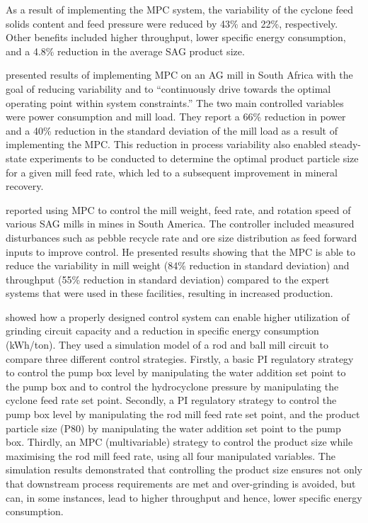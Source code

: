 As a result of implementing the \gls{MPC} system, the variability of the cyclone feed solids content and feed pressure were reduced by 43\% and 22\%, respectively. Other benefits included higher throughput, lower specific energy consumption, and a 4.8\% reduction in the average \acrshort{SAG} product size.

\cite{steyn_benefits_2013} presented results of implementing \gls{MPC} on an \gls{AG} mill in South Africa with the goal of reducing variability and to ``continuously drive towards the optimal operating point within system constraints.'' The two main controlled variables were power consumption and mill load. They report a 66\% reduction in power and a 40\% reduction in the standard deviation of the mill load as a result of implementing the \gls{MPC}. This reduction in process variability also enabled steady-state experiments to be conducted to determine the optimal product particle size for a given mill feed rate, which led to a subsequent improvement in mineral recovery.

\cite{gough_sag_2015} reported using \gls{MPC} to control the mill weight, feed rate, and rotation speed of various \acrshort{SAG} mills in mines in South America. The controller included measured disturbances such as pebble recycle rate and ore size distribution as feed forward inputs to improve control. He presented results showing that the \gls{MPC} is able to reduce the variability in mill weight (84\% reduction in standard deviation) and throughput (55\% reduction in standard deviation) compared to the expert systems that were used in these facilities, resulting in increased production.

\cite{bouchard_reducing_2017} showed how a properly designed control system can enable higher utilization of grinding circuit capacity and a reduction in specific energy consumption (\acrshort{kWh}/ton). They used a simulation model of a rod and ball mill circuit to compare three different control strategies. Firstly, a basic \gls{PI} regulatory strategy to control the pump box level by manipulating the water addition set point to the pump box and to control the hydrocyclone pressure by manipulating the cyclone feed rate set point. Secondly, a \gls{PI} regulatory strategy to control the pump box level by manipulating the rod mill feed rate set point, and the product particle size (\acrshort{P80}) by manipulating the water addition set point to the pump box. Thirdly, an \gls{MPC} (multivariable) strategy to control the product size while maximising the rod mill feed rate, using all four manipulated variables. The simulation results demonstrated that controlling the product size ensures not only that downstream process requirements are met and over-grinding is avoided, but can, in some instances, lead to higher throughput and hence, lower specific energy consumption.

